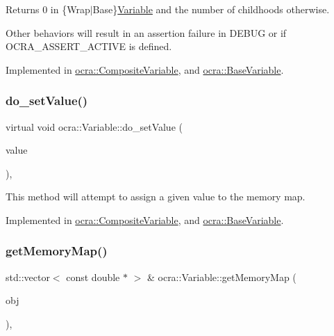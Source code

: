 Returns 0 in \{Wrap$\vert$\+Base\}\hyperlink{classocra_1_1Variable}{Variable} and the number of childhoods otherwise. 

Other behaviors will result in an assertion failure in D\+E\+B\+UG or if O\+C\+R\+A\+\_\+\+A\+S\+S\+E\+R\+T\+\_\+\+A\+C\+T\+I\+VE is defined. 

Implemented in \hyperlink{classocra_1_1CompositeVariable_aa61eea64fe90aea3ebccad355a9e8fb0}{ocra\+::\+Composite\+Variable}, and \hyperlink{classocra_1_1BaseVariable_abf5dc1c3eaa689663cc09e06b8f5b3a1}{ocra\+::\+Base\+Variable}.

\hypertarget{classocra_1_1Variable_a73ff767d0a620f1803573b33f93c69f8}{}\label{classocra_1_1Variable_a73ff767d0a620f1803573b33f93c69f8} 
\subsubsection{\texorpdfstring{do\+\_\+set\+Value()}{do\_setValue()}}
{\footnotesize\ttfamily virtual void ocra\+::\+Variable\+::do\+\_\+set\+Value (\begin{DoxyParamCaption}\item[{const Vector\+Xd \&}]{value }\end{DoxyParamCaption})\hspace{0.3cm}{\ttfamily [protected]}, {}}



This method will attempt to assign a given value to the memory map. 



Implemented in \hyperlink{classocra_1_1CompositeVariable_aa2d9ca737bf529e2686ba9a3ee1126e5}{ocra\+::\+Composite\+Variable}, and \hyperlink{classocra_1_1BaseVariable_a4f53b244e0efba4ca19f558113d29a9c}{ocra\+::\+Base\+Variable}.

\hypertarget{classocra_1_1Variable_a7d1596e0377ebc5a74254027a425d334}{}\label{classocra_1_1Variable_a7d1596e0377ebc5a74254027a425d334} 
\subsubsection{\texorpdfstring{get\+Memory\+Map()}{getMemoryMap()}}
{\footnotesize\ttfamily std\+::vector$<$ const double $\ast$ $>$ \& ocra\+::\+Variable\+::get\+Memory\+Map (\begin{DoxyParamCaption}\item[{\hyperlink{classocra_1_1Variable}{Variable} \&}]{obj }\end{DoxyParamCaption})\hspace{0.3cm}{\ttfamily [static]}, {\ttfamily [protected]}}



